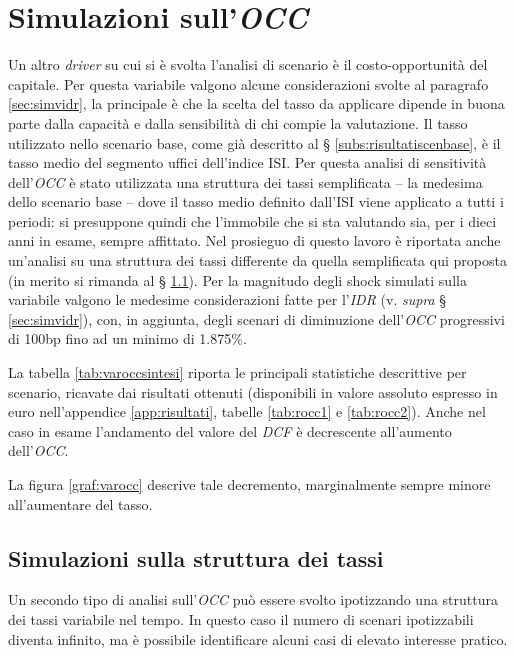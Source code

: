 \section{Simulazioni sull'\textit{OCC}}
\label{sec:simvocc}
Un altro \textit{driver} su cui si è svolta l'analisi di scenario è il costo-opportunità del capitale. Per questa variabile valgono alcune considerazioni svolte al paragrafo \ref{sec:simvidr}, la principale è che la scelta del tasso da applicare dipende in buona parte dalla capacità e dalla sensibilità di chi compie la valutazione. Il tasso utilizzato nello scenario base, come già descritto al § \ref{subs:risultatiscenbase}, è il tasso medio del segmento uffici dell'indice ISI. Per questa analisi di sensitività dell'\textit{OCC} è stato utilizzata una struttura dei tassi semplificata -- la medesima dello scenario base -- dove il tasso medio definito dall'ISI viene applicato a tutti i periodi: si presuppone quindi che l'immobile che si sta valutando sia, per i dieci anni in esame, sempre affittato. Nel prosieguo di questo lavoro è riportata anche un'analisi su una struttura dei tassi differente da quella semplificata qui proposta (in merito si rimanda al § \ref{subs:simvstr}).
Per la magnitudo degli shock simulati sulla variabile valgono le medesime considerazioni fatte per l'\textit{IDR} (v. \textit{supra} § \ref{sec:simvidr}), con, in aggiunta, degli scenari di diminuzione dell'\textit{OCC} progressivi di 100bp fino ad un minimo di 1.875\%.

La tabella \ref{tab:varoccsintesi} riporta le principali statistiche descrittive per scenario, ricavate dai risultati ottenuti (disponibili in valore assoluto espresso in euro nell'appendice \ref{app:risultati}, tabelle \ref{tab:rocc1} e \ref{tab:rocc2}). Anche nel caso in esame l'andamento del valore del \textit{DCF} è decrescente all'aumento dell'\textit{OCC}.




La figura \ref{graf:varocc} descrive tale decremento, marginalmente sempre minore all'aumentare del tasso.


\subsection{Simulazioni sulla struttura dei tassi}
\label{subs:simvstr}
Un secondo tipo di analisi sull'\textit{OCC} può essere svolto ipotizzando una struttura dei tassi variabile nel tempo. In questo caso il numero di scenari ipotizzabili diventa infinito, ma è possibile identificare alcuni casi di elevato interesse pratico.

